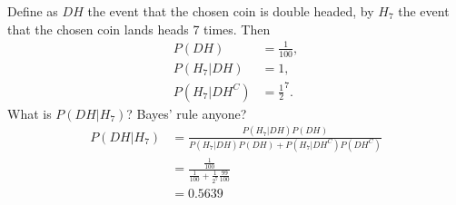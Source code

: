 

\setcounter{theorem}{5}

\begin{exercise}[BH.2.6]
\begin{solution}
	Define as $DH$ the event that the chosen coin is double headed, by $H_{7}$ the event that the chosen coin lands heads 7 times. Then
	\begin{align*}
		P(DH) &= \frac{1}{100},\\
		P(H_{7}|DH) & = 1,\\
		P(H_{7}|DH^{C}) & = \frac{1}{2}^7.
	\end{align*}
	What is $P(DH|H_{7})$? Bayes' rule anyone?
	\begin{align*}
		P(DH|H_{7}) &= \frac{P(H_{7}|DH)P(DH)}{P(H_{7}|DH)P(DH) + P(H_{7}|DH^{C})P(DH^{C})}\\
		& = \frac{\frac{1}{100}}{\frac{1}{100} + \frac{1}{2^7}\frac{99}{100}}\\
		& = 0.5639
	\end{align*}
\end{solution}
\end{exercise}


